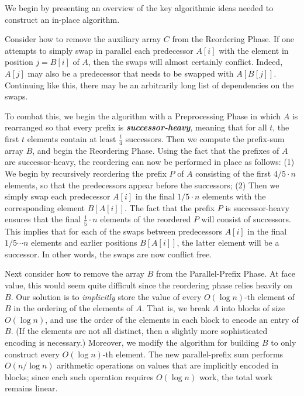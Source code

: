\documentclass[sigplan, 10pt, nonacm]{acmart}
\newcommand{\defn}[1]{{\textit{\textbf{\boldmath #1}}}}
\renewcommand{\paragraph}[1]{\vspace{0.09in}\noindent{\bf \boldmath #1.}}
\theoremstyle{remark}
\theoremstyle{remark}
\begin{document}
\paragraph{Algorithm Outline}
We begin by presenting an overview of the key algorithmic ideas needed
to construct an in-place algorithm.

Consider how to remove the auxiliary array $C$ from the Reordering
Phase. If one attempts to simply swap in parallel each predecessor
$A[i]$ with the element in position $j = B[i]$ of $A$, then the swaps
will almost certainly conflict. Indeed, $A[j]$ may also be a
predecessor that needs to be swapped with $A[B[j]]$. Continuing like
this, there may be an arbitrarily long list of dependencies on the
swaps.

To combat this, we begin the algorithm with a Preprocessing Phase in
which $A$ is rearranged so that every prefix is
\defn{successor-heavy}, meaning that for all $t$, the first $t$
elements contain at least $\frac{t}{4}$ successors. Then we compute
the prefix-sum array $B$, and begin the Reordering Phase. Using the
fact that the prefixes of $A$ are successor-heavy, the reordering can
now be performed in place as follows: (1) We begin by recursively
reordering the prefix $P$ of $A$ consisting of the first $4/5 \cdot n$
elements, so that the predecessors appear before the successors; (2)
Then we simply swap each predecessor $A[i]$ in the final $1/5 \cdot n$
elements with the corresponding element $B[A[i]]$. The fact that the
prefix $P$ is successor-heavy ensures that the final $\frac{1}{5}
\cdot n$ elements of the reordered $P$ will consist of
successors. This implies that for each of the swaps between
predecessors $A[i]$ in the final $1/5 \cdots n$ elements and earlier
positions $B[A[i]]$, the latter element will be a successor. In other
words, the swaps are now conflict free.

Next consider how to remove the array $B$ from the Parallel-Prefix
Phase. At face value, this would seem quite difficult since the
reordering phase relies heavily on $B$. Our solution is to
\emph{implicitly} store the value of every $O(\log n)$-th element of
$B$ in the ordering of the elements of $A$. That is, we break $A$ into
blocks of size $O(\log n)$, and use the order of the elements in each
block to encode an entry of $B$. (If the elements are not all
  distinct, then a slightly more sophisticated encoding is necessary.)
Moreover, we modify the algorithm for building $B$ to only construct
every $O(\log n)$-th element. The new parallel-prefix sum performs
$O(n / \log n)$ arithmetic operations on values that are implicitly
encoded in blocks; since each such operation requires $O(\log n)$
work, the total work remains linear.
\end{document}

